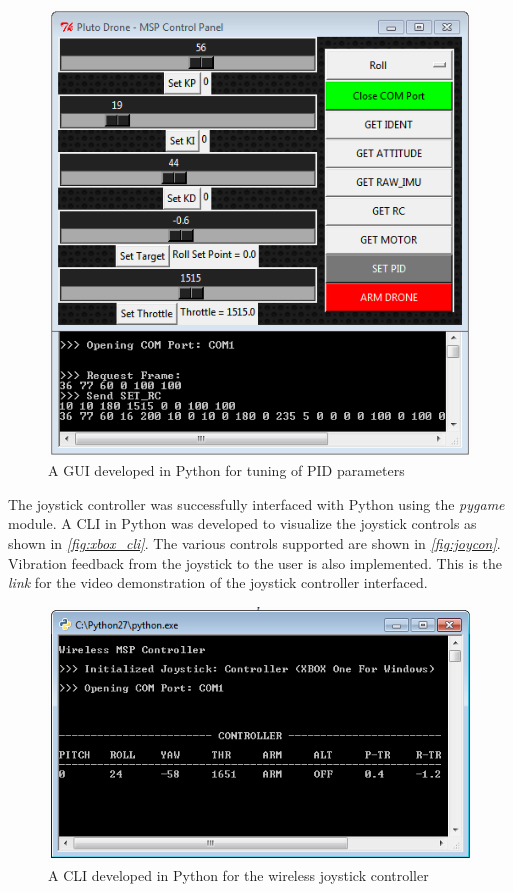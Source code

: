 \documentclass[a4paper,12pt,oneside]{book}
\begin{document}
\begin{figure}[!htb]
\centering
\includegraphics[width=\textwidth]{images/pid_gui}
\caption{A GUI developed in Python for tuning of PID parameters}
\label{fig:pid_gui}
\end{figure}

\clearpage

The joystick controller was successfully interfaced with Python using the \textit{pygame} module. A CLI in Python was developed to visualize the joystick controls as shown in \textit{\autoref{fig:xbox_cli}}. The various controls supported are shown in \textit{\autoref{fig:joycon}}. Vibration feedback from the joystick to the user is also implemented. This is the \textit{link} for the video demonstration of the joystick controller interfaced.\\

\begin{figure}[!htb]
\centering
\includegraphics[width=\textwidth]{images/xbox_cli}
\caption{A CLI developed in Python for the wireless joystick controller}
\label{fig:xbox_cli}
\end{figure}
\end{document}
